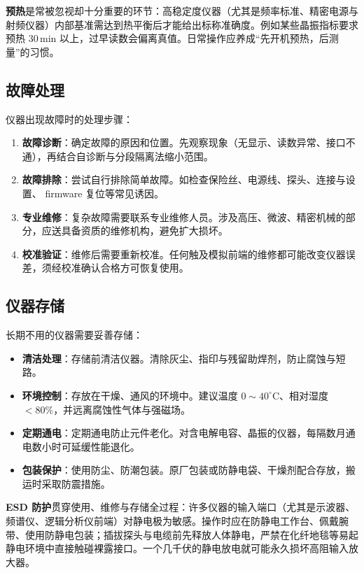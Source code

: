 \textbf{预热}是常被忽视却十分重要的环节：高稳定度仪器（尤其是频率标准、精密电源与射频仪器）内部基准需达到热平衡后才能给出标称准确度。例如某些晶振指标要求预热 $30\,\mathrm{min}$ 以上，过早读数会偏离真值。日常操作应养成“先开机预热，后测量”的习惯。

\subsection{故障处理}

仪器出现故障时的处理步骤：

\begin{enumerate}
    \item \textbf{故障诊断}：确定故障的原因和位置。先观察现象（无显示、读数异常、接口不通），再结合自诊断与分段隔离法缩小范围。
    \item \textbf{故障排除}：尝试自行排除简单故障。如检查保险丝、电源线、探头、连接与设置、 firmware 复位等常见诱因。
    \item \textbf{专业维修}：复杂故障需要联系专业维修人员。涉及高压、微波、精密机械的部分，应送具备资质的维修机构，避免扩大损坏。
    \item \textbf{校准验证}：维修后需要重新校准。任何触及模拟前端的维修都可能改变仪器误差，须经校准确认合格方可恢复使用。
\end{enumerate}

\subsection{仪器存储}

长期不用的仪器需要妥善存储：

\begin{itemize}
    \item \textbf{清洁处理}：存储前清洁仪器。清除灰尘、指印与残留助焊剂，防止腐蚀与短路。
    \item \textbf{环境控制}：存放在干燥、通风的环境中。建议温度 $0\sim40^\circ\mathrm{C}$、相对湿度 $<80\%$，并远离腐蚀性气体与强磁场。
    \item \textbf{定期通电}：定期通电防止元件老化。对含电解电容、晶振的仪器，每隔数月通电数小时可延缓性能退化。
    \item \textbf{包装保护}：使用防尘、防潮包装。原厂包装或防静电袋、干燥剂配合存放，搬运时采取防震措施。
\end{itemize}

\textbf{ESD 防护}贯穿使用、维修与存储全过程：许多仪器的输入端口（尤其是示波器、频谱仪、逻辑分析仪前端）对静电极为敏感。操作时应在防静电工作台、佩戴腕带、使用防静电包装；插拔探头与电缆前先释放人体静电，严禁在化纤地毯等易起静电环境中直接触碰裸露接口。一个几千伏的静电放电就可能永久损坏高阻输入放大器。

